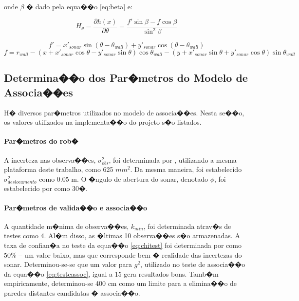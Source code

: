 onde $\beta$ � dado pela equa��o \ref{eq:beta} e:

\begin{equation}
H_\theta = \frac{\partial h(x)}{\partial\theta} = \frac{f'\sin\beta-f\cos\beta}{\sin^2\beta}
\end{equation}

\begin{equation}
f' = x'_{sonar} \sin(\theta-\theta_{wall}) + y'_{sonar} \cos(\theta-\theta_{wall})
\end{equation}
\begin{equation}
f = r_{wall} - (x + x'_{sonar} \cos \theta - y'_{sonar} \sin \theta)\cos \theta_{wall} - (y + x'_{sonar} \sin \theta + y'_{sonar} \cos \theta)\sin \theta_{wall}
\end{equation}

\subsection{Determina��o dos Par�metros do Modelo de Associa��es}

H� diversos par�metros utilizados no modelo de associa��es. Nesta se��o, os valores utilizados na implementa��o do projeto s�o listados.

\paragraph{Par�metros do rob�} A incerteza nas observa��es, $\sigma^2_{obs}$, foi determinada por \cite{barra}, utilizando a mesma plataforma deste trabalho, como 625 $mm^2$. Da mesma maneira, foi estabelecido $\sigma^2_{deslocamento}$ como 0.05 m. O �ngulo de abertura do sonar, denotado $\phi$, foi estabelecido por \cite{barra} como 30�.
\paragraph{Par�metros de valida��o e associa��o} A quantidade m�nima de observa��es, $k_{min}$, foi determinada atrav�s de testes como 4. Al�m disso, as �ltimas 10 observa��es s�o armazenadas. A taxa de confian�a no teste da equa��o \ref{eq:chitest} foi determinada por \cite{barra} como 50\% -- um valor baixo, mas que corresponde bem � realidade das incertezas do sonar. Determinou-se-se que um valor para $g^2$, utilizado no teste de associa��o da equa��o \ref{eq:testeassoc}, igual a 15 gera resultados bons. Tamb�m empiricamente, determinou-se 400 cm como um limite para a elimina��o de paredes distantes candidatas � associa��o.

